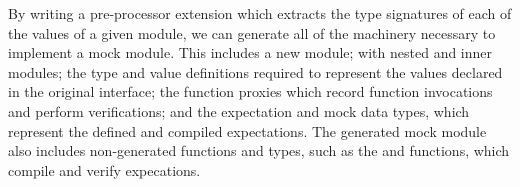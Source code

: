By writing a pre-processor extension which extracts the type
signatures of each of the values of a given module, we can generate
all of the machinery necessary to implement a mock module. This
includes a new module; with nested  and  inner
modules; the type and value definitions required to represent the
values declared in the original interface; the function proxies which
record function invocations and perform verifications; and the
expectation and mock data types, which represent the defined and
compiled expectations. The generated mock module also includes
non-generated functions and types, such as the  and
 functions, which compile and verify expecations.
